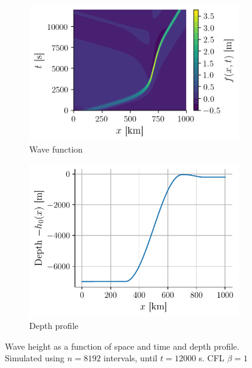 \begin{figure}[h]
    \centering
    \begin{subfigure}{0.53\linewidth}
        \centering
        \includegraphics[width=\linewidth]{figures/corail_eq1_mouvement_vague.png}
        \caption{Wave function}
        \label{fig:corail_eq1_mouv}
    \end{subfigure}
    \begin{subfigure}{0.46\linewidth}
        \centering
        \includegraphics[width=\linewidth]{figures/corail_eq1_depth.pdf}
        \caption{Depth profile}
        \label{fig:corail_eq1_depth}
    \end{subfigure}
    \caption{Wave height as a function of space and time and depth profile. Simulated using \(n=8192\) intervals, until \(t=12000\) \si{\second}. CFL \(\beta=1\)}
\end{figure}

